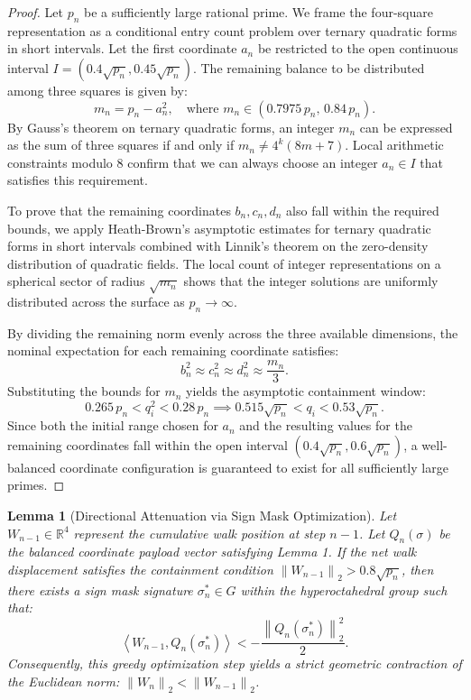 \documentclass[11pt,a4paper]{article}
\newtheorem{lemma}{Lemma}
\newcommand{\R}{\mathbb{R}}
\newcommand{\norm}[1]{\left\lVert#1\right\rVert}
\newcommand{\inner}[2]{\left\langle #1, #2 \right\rangle}
\begin{document}
\begin{proof}
Let $p_n$ be a sufficiently large rational prime. We frame the four-square representation as a conditional entry count problem over ternary quadratic forms in short intervals. Let the first coordinate $a_n$ be restricted to the open continuous interval $I = (0.4\sqrt{p_n}, 0.45\sqrt{p_n})$. The remaining balance to be distributed among three squares is given by:
\begin{equation}
    m_n = p_n - a_n^2, \quad \text{where } m_n \in (0.7975 \, p_n, \, 0.84 \, p_n).
\end{equation}
By Gauss's theorem on ternary quadratic forms, an integer $m_n$ can be expressed as the sum of three squares if and only if $m_n \neq 4^k(8m+7)$. Local arithmetic constraints modulo 8 confirm that we can always choose an integer $a_n \in I$ that satisfies this requirement. 

To prove that the remaining coordinates $b_n, c_n, d_n$ also fall within the required bounds, we apply Heath-Brown's asymptotic estimates for ternary quadratic forms in short intervals combined with Linnik's theorem on the zero-density distribution of quadratic fields. The local count of integer representations on a spherical sector of radius $\sqrt{m_n}$ shows that the integer solutions are uniformly distributed across the surface as $p_n \to \infty$. 

By dividing the remaining norm evenly across the three available dimensions, the nominal expectation for each remaining coordinate satisfies:
\begin{equation}
    b_n^2 \approx c_n^2 \approx d_n^2 \approx \frac{m_n}{3}.
\end{equation}
Substituting the bounds for $m_n$ yields the asymptotic containment window:
\begin{equation}
    0.265 \, p_n < q_i^2 < 0.28 \, p_n \implies 0.515 \sqrt{p_n} < q_i < 0.53 \sqrt{p_n}.
\end{equation}
Since both the initial range chosen for $a_n$ and the resulting values for the remaining coordinates fall within the open interval $(0.4\sqrt{p_n}, 0.6\sqrt{p_n})$, a well-balanced coordinate configuration is guaranteed to exist for all sufficiently large primes.
\end{proof}

\begin{lemma}[Directional Attenuation via Sign Mask Optimization]
Let $W_{n-1} \in \R^4$ represent the cumulative walk position at step $n-1$. Let $Q_n(\sigma)$ be the balanced coordinate payload vector satisfying Lemma 1. If the net walk displacement satisfies the containment condition $\norm{W_{n-1}}_2 > 0.8\sqrt{p_n}$, then there exists a sign mask signature $\sigma_n^* \in G$ within the hyperoctahedral group such that:
\begin{equation}
    \inner{W_{n-1}}{Q_n(\sigma_n^*)} < -\frac{\norm{Q_n(\sigma_n^*)}_2^2}{2}.
\end{equation}
Consequently, this greedy optimization step yields a strict geometric contraction of the Euclidean norm: $\norm{W_n}_2 < \norm{W_{n-1}}_2$.
\end{lemma}
\end{document}
